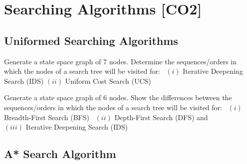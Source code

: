\vspace{2em}
\section*{Searching Algorithms [CO2]}

\subsection*{Uniformed Searching Algorithms}

\begin{Question}[4]
   Generate a state space graph of 7 nodes. Determine the sequences/orders in which the nodes of a search tree will be visited for: \ 
   $(i)$ Iterative Deepening Search (IDS)
   $(ii)$ Uniform Cost Search (UCS)
\end{Question}

\vspace{1em}
\begin{Question}[6]
   Generate a state space graph of 6 nodes. Show the differences between the sequences/orders in which the nodes of a search tree will be visited for: \
   $(i)$ Breadth-First Search (BFS) \ 
   $(ii)$ Depth-First Search (DFS) and \\
   $(iii)$ Iterative Deepening Search (IDS)
\end{Question}



\subsection*{A* Search Algorithm}

